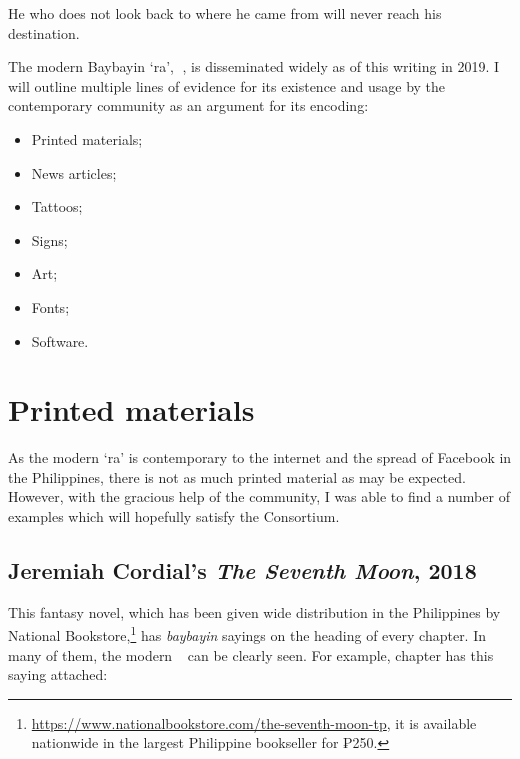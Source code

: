 \documentclass[a4paper,pagesize,openany,14pt,parskip=never]{scrbook}
\newcommand{\≈}{$\approx$}
\newcommand{\ra}{{\baybayin ᜍ}}
\begin{document}
    He who does not look back to where he came from will never reach his destination.

\newpage
{}
The modern Baybayin `ra', {\baybayin ᜍ}, is disseminated widely as of this writing in 2019. I will outline multiple lines of evidence for its existence and usage by the contemporary community as an argument for its encoding:

\begin{itemize}
    \item Printed materials;
    \item News articles;
    \item Tattoos;
    \item Signs;
    \item Art;
    \item Fonts;
    \item Software.
\end{itemize}

\section{Printed materials}

As the modern `ra' is contemporary to the internet and the spread of Facebook in the Philippines, there is not as much printed material as may be expected. However, with the gracious help of the community, I was able to find a number of examples which will hopefully satisfy the Consortium.

\subsection{Jeremiah Cordial's {\em The Seventh Moon}, 2018}

This fantasy novel, which has been given wide distribution in the Philippines by National Bookstore,\footnote{\url{https://www.nationalbookstore.com/the-seventh-moon-tp}, it is available nationwide in the largest Philippine bookseller for ₱250.} has {\em baybayin} sayings on the heading of every chapter. In many of them, the modern \ra\ can be clearly seen. For example, chapter  has this saying attached:
\end{document}
